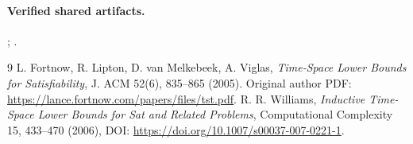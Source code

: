 \documentclass[11pt]{article}
\begin{document}
\paragraph{Verified shared artifacts.}
;
.

\begin{thebibliography}{9}
 L. Fortnow, R. Lipton, D. van Melkebeek,
A. Viglas, \emph{Time-Space Lower Bounds for
Satisfiability}, J. ACM 52(6), 835--865
(2005). Original author PDF:
\url{https://lance.fortnow.com/papers/files/tst.pdf}.
 R. R. Williams,
\emph{Inductive Time-Space Lower Bounds
for Sat and Related Problems},
Computational Complexity 15, 433--470
(2006), DOI:
\url{https://doi.org/10.1007/s00037-007-0221-1}.
\end{thebibliography}
\end{document}
